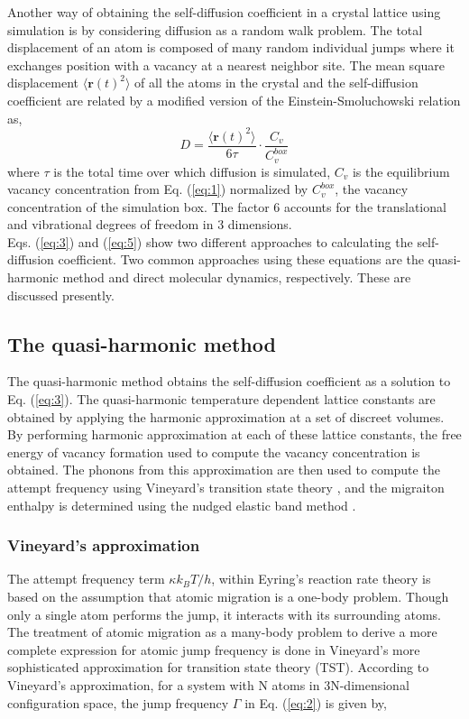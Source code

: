 \documentclass{article}
\begin{document}
Another way of obtaining the self-diffusion coefficient in a crystal lattice using simulation is by considering diffusion as a random walk problem. The total displacement of an atom is composed of many random individual jumps where it exchanges position with a vacancy at a nearest neighbor site. The mean square displacement $\langle \bm{r}(t)^2 \rangle$ of all the atoms in the crystal and the self-diffusion coefficient are related by a modified version of the Einstein-Smoluchowski relation \cite{VonSmoluchowski1906} as,
%
\begin{equation} \label{eq:5}
D = \dfrac{\langle \bm{r}(t)^2 \rangle}{6\tau} \cdot \dfrac{C_v}{C_v^{box}}
\end{equation}
%
where $\tau$ is the total time over which diffusion is simulated, $C_v$ is the equilibrium vacancy concentration from Eq. (\ref{eq:1}) normalized by $C_v^{box}$, the vacancy concentration of the simulation box. The factor 6 accounts for the translational and vibrational degrees of freedom in 3 dimensions.\\

Eqs. (\ref{eq:3}) and (\ref{eq:5}) show two different approaches to calculating the self-diffusion coefficient. Two common approaches using these equations are the quasi-harmonic method and direct molecular dynamics, respectively. These are discussed presently.

\subsection{The quasi-harmonic method} 

The quasi-harmonic method obtains the self-diffusion coefficient as a solution to Eq. (\ref{eq:3}). The quasi-harmonic temperature dependent lattice constants are obtained by applying the harmonic approximation at a set of discreet volumes. By performing harmonic approximation at each of these lattice constants, the free energy of vacancy formation used to compute the vacancy concentration is obtained. The phonons from this approximation are then used to compute the attempt frequency using Vineyard's transition state theory \cite{Vineyard1957}, and the migraiton enthalpy is determined using the nudged elastic band method \cite{Henkelman2000}.

\subsubsection{Vineyard's approximation}

\noindent The attempt frequency term $\kappa k_BT/h$, within Eyring's reaction rate theory is based on the assumption that atomic migration is a one-body problem. Though only a single atom performs the jump, it interacts with its surrounding atoms. The treatment of atomic migration as a many-body problem to derive a more complete expression for atomic jump frequency is done in Vineyard's more sophisticated approximation for transition state theory (TST). According to Vineyard's approximation, for a system with N atoms in 3N-dimensional configuration space, the jump frequency $\Gamma$ in Eq. (\ref{eq:2}) is given by,
\end{document}
